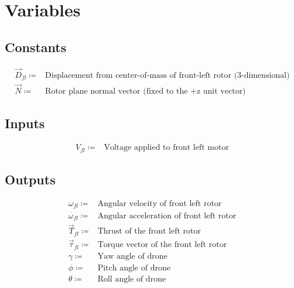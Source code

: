 \documentclass{article}
\begin{document}
\section{Variables}

\subsection{Constants}

\begin{equation}
\begin{aligned}
     \Vec{D}_{fl} \coloneqq& \text{Displacement from center-of-mass of front-left rotor (3-dimensional)}\\
     \Vec{N} \coloneqq& \text{Rotor plane normal vector (fixed to the +z unit vector)}
\end{aligned}
\end{equation}

\subsection{Inputs}
\begin{equation}
\begin{aligned}
     V_{fl} \coloneqq& \text{Voltage applied to front left motor}
\end{aligned}
\end{equation}

\subsection{Outputs}
\begin{equation}
\begin{aligned}
     \omega_{fl} \coloneqq& \text{Angular velocity of front left rotor}\\
     \dot{\omega_{fl}} \coloneqq& \text{Angular acceleration of front left rotor}\\
     \vec{T}_{fl} \coloneqq& \text{Thrust of the front left rotor}\\
     \vec{\tau}_{fl} \coloneqq& \text{Torque vector of the front left rotor}\\
     \gamma \coloneqq& \text{Yaw angle of drone}\\
     \phi \coloneqq& \text{Pitch angle of drone}\\
     \theta \coloneqq& \text{Roll angle of drone}\\
\end{aligned}
\end{equation}
\end{document}
